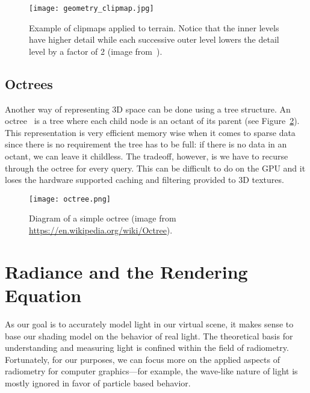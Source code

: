 \begin{figure}[h]
\centering
\texttt{[image: geometry\_clipmap.jpg]}
\caption{Example of clipmaps applied to terrain. Notice that the inner levels have higher detail while each successive outer level lowers the detail level by a factor of 2 (image from~\cite{Losasso:2004:GCT:1186562.1015799}).}
\label{fig:geometryclipmaps}
\end{figure}

\subsection{Octrees}
Another way of representing 3D space can be done using a tree structure. An octree~\cite{Cra12, meagher1982geometric} is a tree where each child node is an octant of its parent (see Figure~\ref{fig:octree}). This representation is very efficient memory wise when it comes to sparse data since there is no requirement the tree has to be full: if there is no data in an octant, we can leave it childless. The tradeoff, however, is we have to recurse through the octree for every query. This can be difficult to do on the GPU and it loses the hardware supported caching and filtering provided to 3D textures.

\begin{figure}[h]
\centering
\texttt{[image: octree.png]}
\caption{Diagram of a simple octree (image from \url{https://en.wikipedia.org/wiki/Octree}).}
\label{fig:octree}
\end{figure}

\section{Radiance and the Rendering Equation}
As our goal is to accurately model light in our virtual scene, it makes sense to base our shading model on the behavior of real light. The theoretical basis for understanding and measuring light is confined within the field of radiometry. Fortunately, for our purposes, we can focus more on the applied aspects of radiometry for computer graphics---for example, the wave-like nature of light is mostly ignored in favor of particle based behavior.

